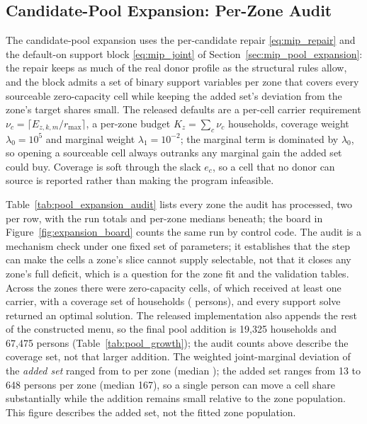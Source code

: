 \FloatBarrier
\subsection{Candidate-Pool Expansion: Per-Zone Audit}
\label{sec:pool_expansion_audit}

The candidate-pool expansion uses the per-candidate repair
\eqref{eq:mip_repair} and the default-on support block \eqref{eq:mip_joint} of
Section~\ref{sec:mip_pool_expansion}: the repair keeps as much of the real donor
profile as the structural rules allow, and the block admits a set of binary
support variables per zone that covers every sourceable zero-capacity cell while
keeping the added set's deviation from the zone's target shares small. The released defaults are a per-cell carrier requirement
$\nu_c=\lceil E_{z,k,m}/r_{\max}\rceil$, a per-zone budget
$K_z=\sum_c\nu_c$ households, coverage weight $\lambda_0=10^{5}$ and marginal
weight $\lambda_1=10^{-2}$; the marginal term is dominated by $\lambda_0$, so
opening a sourceable cell always outranks any marginal gain the added set could
buy. Coverage is soft through the slack $e_c$, so a cell that no donor can source
is reported rather than making the program infeasible.


Table~\ref{tab:pool_expansion_audit} lists every zone the audit has processed,
two per row, with the run totals and per-zone medians beneath; the board in
Figure~\ref{fig:expansion_board} counts the same run by control code. The audit is
a mechanism check under one fixed set of parameters; it establishes that the step
can make the cells a zone's slice cannot supply selectable, not that it closes any
zone's full deficit, which is a question for the zone fit and the validation
tables. Across the \ExpZones{} zones there were
\ExpZeroCells{} zero-capacity cells, of which \ExpCoveredCells{} received at least
one carrier, with a coverage set of
\ExpAddedHouseholds{} households (\ExpAddedPersons{} persons), and every support
solve returned an optimal solution. The released implementation also appends the
rest of the constructed menu, so the final pool addition is 19{,}325 households
and 67{,}475 persons (Table~\ref{tab:pool_growth}); the audit counts above
describe the coverage set, not that larger addition. The weighted joint-marginal deviation of the
\emph{added set} ranged from \ExpDevSumMin{} to \ExpDevSumMax{} per zone (median
\ExpDevSumMedian); the added set ranges from 13 to 648 persons per zone (median
167), so a single person can move a cell share substantially while the addition
remains small relative to the zone population. This figure describes the added set,
not the fitted zone population.

